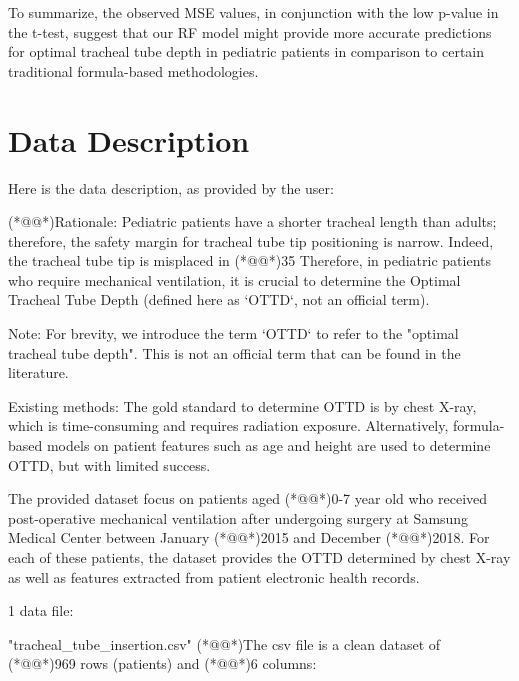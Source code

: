 \documentclass[11pt]{article}
\begin{document}
To summarize, the observed MSE values, in conjunction with the low p-value in the t-test, suggest that our RF model might provide more accurate predictions for optimal tracheal tube depth in pediatric patients in comparison to certain traditional formula-based methodologies.


\clearpage
\appendix

\section{Data Description} \label{sec:data_description} Here is the data description, as provided by the user:

\begin{codeoutput}
(*@@*)Rationale: Pediatric patients have a shorter tracheal length than adults; therefore, the safety margin for tracheal tube tip positioning is narrow.
Indeed, the tracheal tube tip is misplaced in (*@@*)35%
Therefore, in pediatric patients who require mechanical ventilation, it is crucial to determine the Optimal Tracheal Tube Depth (defined here as `OTTD`, not an official term).

Note: For brevity, we introduce the term `OTTD` to refer to the "optimal tracheal tube depth". This is not an official term that can be found in the literature.

Existing methods: The gold standard to determine OTTD is by chest X-ray, which is time-consuming and requires radiation exposure.
Alternatively, formula-based models on patient features such as age and height are used to determine OTTD, but with limited success.

The provided dataset focus on patients aged (*@@*)0-7 year old who received post-operative mechanical ventilation after undergoing surgery at Samsung Medical Center between January (*@@*)2015 and December (*@@*)2018.
For each of these patients, the dataset provides the OTTD determined by chest X-ray as well as features extracted from patient electronic health records.


1 data file:

"tracheal_tube_insertion.csv"
(*@@*)The csv file is a clean dataset of (*@@*)969 rows (patients) and (*@@*)6 columns:


\end{codeoutput}
\end{document}
